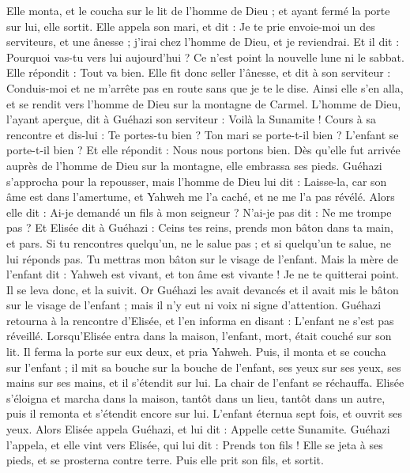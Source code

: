 \begin{multicols}{2}
Elle monta, et le coucha sur le lit de l’homme de Dieu ; et ayant fermé la porte sur lui, elle sortit.
Elle appela son mari, et dit : Je te prie envoie-moi un des serviteurs, et une ânesse ; j’irai chez l’homme de Dieu, et je reviendrai.
Et il dit : Pourquoi vas-tu vers lui aujourd’hui ? Ce n’est point la nouvelle lune ni le sabbat. Elle répondit : Tout va bien.
Elle fit donc seller l’ânesse, et dit à son serviteur : Conduis-moi et ne m’arrête pas en route sans que je te le dise.
Ainsi elle s’en alla, et se rendit vers l’homme de Dieu sur la montagne de Carmel. L’homme de Dieu, l’ayant aperçue, dit à Guéhazi son serviteur : Voilà la Sunamite !
Cours à sa rencontre et dis-lui : Te portes-tu bien ? Ton mari se porte-t-il bien ? L’enfant se porte-t-il bien ? Et elle répondit : Nous nous portons bien.
Dès qu’elle fut arrivée auprès de l’homme de Dieu sur la montagne, elle embrassa ses pieds. Guéhazi s’approcha pour la repousser, mais l’homme de Dieu lui dit : Laisse-la, car son âme est dans l’amertume, et Yahweh me l’a caché, et ne me l’a pas révélé.
Alors elle dit : Ai-je demandé un fils à mon seigneur ? N’ai-je pas dit : Ne me trompe pas ?
Et Elisée dit à Guéhazi : Ceins tes reins, prends mon bâton dans ta main, et pars. Si tu rencontres quelqu’un, ne le salue pas ; et si quelqu’un te salue, ne lui réponds pas. Tu mettras mon bâton sur le visage de l’enfant.
Mais la mère de l’enfant dit : Yahweh est vivant, et ton âme est vivante ! Je ne te quitterai point. Il se leva donc, et la suivit.
Or Guéhazi les avait devancés et il avait mis le bâton sur le visage de l’enfant ; mais il n’y eut ni voix ni signe d’attention. Guéhazi retourna à la rencontre d’Elisée, et l’en informa en disant : L’enfant ne s’est pas réveillé.
Lorsqu’Elisée entra dans la maison, l’enfant, mort, était couché sur son lit.
Il ferma la porte sur eux deux, et pria Yahweh.
Puis, il monta et se coucha sur l’enfant ; il mit sa bouche sur la bouche de l’enfant, ses yeux sur ses yeux, ses mains sur ses mains, et il s’étendit sur lui. La chair de l’enfant se réchauffa.
Elisée s’éloigna et marcha dans la maison, tantôt dans un lieu, tantôt dans un autre, puis il remonta et s’étendit encore sur lui. L’enfant éternua sept fois, et ouvrit ses yeux.
Alors Elisée appela Guéhazi, et lui dit : Appelle cette Sunamite. Guéhazi l’appela, et elle vint vers Elisée, qui lui dit : Prends ton fils !
Elle se jeta à ses pieds, et se prosterna contre terre. Puis elle prit son fils, et sortit.

\end{multicols}
